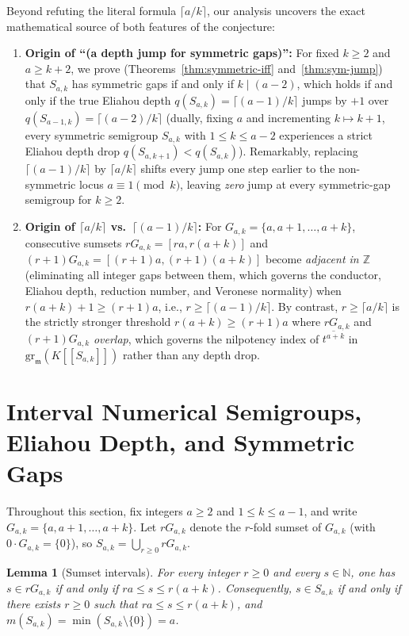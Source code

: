 \documentclass[11pt]{amsart}
\newtheorem{lemma}[theorem]{Lemma}
\theoremstyle{definition}
\theoremstyle{remark}
\newcommand{\NN}{\mathbb{N}}
\newcommand{\ZZ}{\mathbb{Z}}
\newcommand{\mm}{\mathfrak{m}}
\newcommand{\gr}{\mathrm{gr}}
\begin{document}
Beyond refuting the literal formula $\lceil a/k \rceil$, our analysis uncovers the exact mathematical source of both features of the conjecture:
\begin{enumerate}
  \item \textbf{Origin of ``(a depth jump for symmetric gaps)'':} For fixed $k \ge 2$ and $a \ge k+2$, we prove (Theorems~\ref{thm:symmetric-iff} and~\ref{thm:sym-jump}) that $S_{a,k}$ has symmetric gaps if and only if $k \mid (a - 2)$, which holds if and only if the true Eliahou depth $q(S_{a,k}) = \lceil (a-1)/k \rceil$ jumps by $+1$ over $q(S_{a-1,k}) = \lceil (a-2)/k \rceil$ (dually, fixing $a$ and incrementing $k \mapsto k+1$, every symmetric semigroup $S_{a,k}$ with $1 \le k \le a-2$ experiences a strict Eliahou depth drop $q(S_{a,k+1}) < q(S_{a,k})$). Remarkably, replacing $\lceil (a-1)/k \rceil$ by $\lceil a/k \rceil$ shifts every jump one step earlier to the non-symmetric locus $a \equiv 1 \pmod{k}$, leaving \emph{zero} jump at every symmetric-gap semigroup for $k \ge 2$.
  \item \textbf{Origin of $\lceil a/k \rceil$ vs.\ $\lceil (a-1)/k \rceil$:} For $G_{a,k} = \{a, a+1, \dots, a+k\}$, consecutive sumsets $r G_{a,k} = [ra, r(a+k)]$ and $(r+1) G_{a,k} = [(r+1)a, (r+1)(a+k)]$ become \emph{adjacent in $\ZZ$} (eliminating all integer gaps between them, which governs the conductor, Eliahou depth, reduction number, and Veronese normality) when $r(a+k) + 1 \ge (r+1)a$, i.e., $r \ge \lceil (a-1)/k \rceil$. By contrast, $r \ge \lceil a/k \rceil$ is the strictly stronger threshold $r(a+k) \ge (r+1)a$ where $r G_{a,k}$ and $(r+1) G_{a,k}$ \emph{overlap}, which governs the nilpotency index of $\overline{t^{a+k}}$ in $\gr_{\mm}(K[[S_{a,k}]])$ rather than any depth drop.
\end{enumerate}

\section{Interval Numerical Semigroups, Eliahou Depth, and Symmetric Gaps}
\label{sec:semigroup}

Throughout this section, fix integers $a \ge 2$ and $1 \le k \le a-1$, and write $G_{a,k} = \{a, a+1, \dots, a+k\}$. Let $r G_{a,k}$ denote the $r$-fold sumset of $G_{a,k}$ (with $0 \cdot G_{a,k} = \{0\}$), so $S_{a,k} = \bigcup_{r \ge 0} r G_{a,k}$.

\begin{lemma}[Sumset intervals]
\label{lem:sumset}
For every integer $r \ge 0$ and every $s \in \NN$, one has $s \in r G_{a,k}$ if and only if $r a \le s \le r(a+k)$. Consequently, $s \in S_{a,k}$ if and only if there exists $r \ge 0$ such that $ra \le s \le r(a+k)$, and $m(S_{a,k}) = \min(S_{a,k} \setminus \{0\}) = a$.
\end{lemma}
\end{document}
